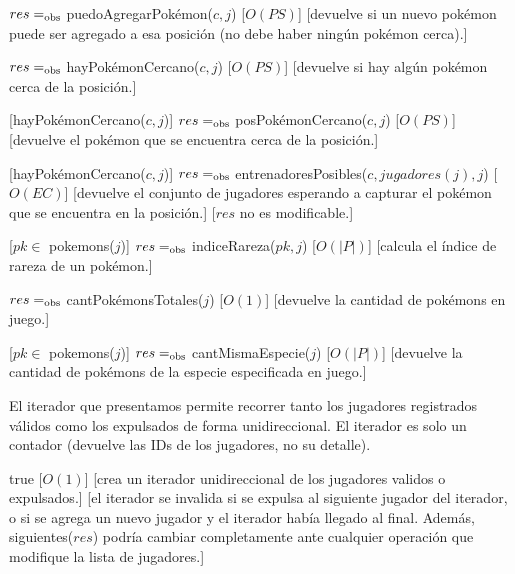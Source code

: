 \begin{Interfaz}
	{$res =_{\mathrm{obs}}$ puedoAgregarPokémon($c,j$)}
	[$O(PS)$]
	[devuelve si un nuevo pokémon puede ser agregado a esa posición (no debe haber ningún pokémon cerca).]

	{$res =_{\mathrm{obs}}$ hayPokémonCercano($c,j$)}
	[$O(PS)$]
	[devuelve si hay algún pokémon cerca de la posición.]

	[hayPokémonCercano($c,j$)]
	{$res =_{\mathrm{obs}}$ posPokémonCercano($c,j$)}
	[$O(PS)$]
	[devuelve el pokémon que se encuentra cerca de la posición.]

	[hayPokémonCercano($c,j$)]
	{$res =_{\mathrm{obs}}$ entrenadoresPosibles($c, jugadores(j), j$)} %
	[$O(EC)$]
	[devuelve el conjunto de jugadores esperando a capturar el pokémon que se encuentra en la posición.]
	[$res$ no es modificable.]

	[$pk \in$ pokemons($j$)]
	{$res =_{\mathrm{obs}}$ indiceRareza($pk,j$)}
	[$O(|P|)$]
	[calcula el índice de rareza de un pokémon.]

	{$res =_{\mathrm{obs}}$ cantPokémonsTotales($j$)}
	[$O(1)$]
	[devuelve la cantidad de pokémons en juego.]

	[$pk \in$ pokemons($j$)]
	{$res =_{\mathrm{obs}}$ cantMismaEspecie($j$)}
	[$O(|P|)$]
	[devuelve la cantidad de pokémons de la especie especificada en juego.]


	El iterador que presentamos permite recorrer tanto los jugadores registrados válidos como los expulsados de forma unidireccional. El iterador es solo un contador (devuelve las IDs de los jugadores, no su detalle).


	{true}
	[$O(1)$]
	[crea un iterador unidireccional de los jugadores validos o expulsados.]
	[el iterador se invalida si se expulsa al siguiente jugador del iterador, o si se agrega un nuevo jugador y el iterador había llegado al final. Además, siguientes($res$) podría cambiar completamente ante cualquier operación que modifique la lista de jugadores.]


\end{Interfaz}
